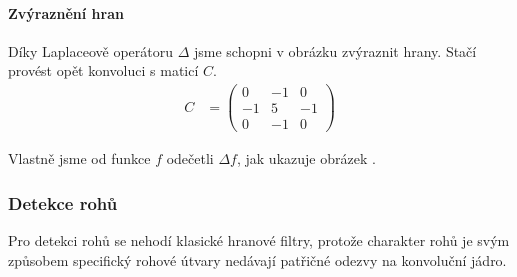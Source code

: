 


\paragraph{Zvýraznění hran} 

Díky Laplaceově operátoru $\Delta$ jsme schopni v obrázku zvýraznit hrany. 
Stačí provést opět konvoluci s maticí $C$.
\begin{align}
C &= \left(\begin{array}{ccc}0&-1&0\\-1&5&-1\\0&-1&0\end{array}\right)
\end{align}

Vlastně jsme od funkce $f$ odečetli $\Delta f$, jak ukazuje obrázek .


\subsubsection{Detekce rohů}
Pro detekci rohů se nehodí klasické hranové filtry, protože charakter rohů je svým způsobem
specifický rohové útvary nedávají patřičné odezvy na konvoluční jádro.


